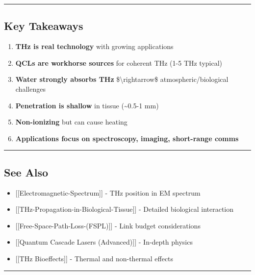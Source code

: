 \begin{center}\rule{0.5\linewidth}{0.5pt}\end{center}

\subsection{Key Takeaways}\label{key-takeaways}

\begin{enumerate}
\def\labelenumi{\arabic{enumi}.}
\tightlist
\item
  \textbf{THz is real technology} with growing applications
\item
  \textbf{QCLs are workhorse sources} for coherent THz (1-5 THz typical)
\item
  \textbf{Water strongly absorbs THz} \$\textbackslash rightarrow\$
  atmospheric/biological challenges
\item
  \textbf{Penetration is shallow} in tissue (\textasciitilde0.5-1 mm)
\item
  \textbf{Non-ionizing} but can cause heating
\item
  \textbf{Applications focus on spectroscopy, imaging, short-range
  comms}
\end{enumerate}

\begin{center}\rule{0.5\linewidth}{0.5pt}\end{center}

\subsection{See Also}\label{see-also}

\begin{itemize}
\tightlist
\item
  {[}{[}Electromagnetic-Spectrum{]}{]} - THz position in EM spectrum
\item
  {[}{[}THz-Propagation-in-Biological-Tissue{]}{]} - Detailed biological
  interaction
\item
  {[}{[}Free-Space-Path-Loss-(FSPL){]}{]} - Link budget considerations
\item
  {[}{[}Quantum Cascade Lasers (Advanced){]}{]} - In-depth physics
\item
  {[}{[}THz Bioeffects{]}{]} - Thermal and non-thermal effects
\end{itemize}

\begin{center}\rule{0.5\linewidth}{0.5pt}\end{center}

